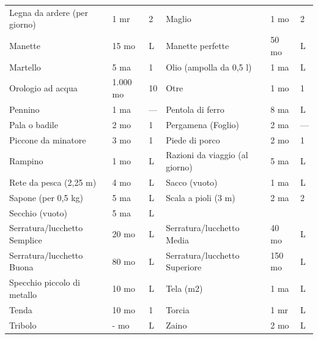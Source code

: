 \documentclass[a4paper,11pt,twoside,openany]{book}
\begin{document}
\begin{tabularx}{1\textwidth}{XllXll}
	Legna da ardere (per giorno)& 1 mr& 2   & Maglio& 1 mo& 2   \\
	Manette & 15 mo    & L   & Manette perfette    & 50 mo& L   \\
	Martello& 5 ma& 1   & Olio (ampolla da 0,5 l)& 1 ma& L   \\
	Orologio ad acqua   & 1.000 mo & 10  & Otre  & 1 mo& 1   \\
	Pennino & 1 ma& —   & Pentola di ferro    & 8 ma& L   \\
	Pala o badile & 2 mo& 1   & Pergamena (Foglio)  & 2 ma& —   \\
	Piccone da minatore & 3 mo& 1   & Piede di porco& 2 mo& 1   \\
	Rampino & 1 mo& L   & Razioni da viaggio (al giorno)    & 5 ma& L   \\
	Rete da pesca (2,25 m)& 4 mo& L   & Sacco (vuoto) & 1 ma& L   \\
	Sapone (per 0,5 kg) & 5 ma& L   & Scala a pioli (3 m) & 2 ma& 2   \\
	Secchio (vuoto)& 5 ma& L   & \\
	Serratura/lucchetto Semplice& 20 mo    & L   & Serratura/lucchetto Media & 40 mo& L   \\
	Serratura/lucchetto Buona & 80 mo    & L   & Serratura/lucchetto Superiore& 150 mo    & L   \\
	Specchio piccolo di metallo & 10 mo    & L   & Tela (m2)& 1 ma& L   \\
	Tenda & 10 mo    & 1   & Torcia& 1 mr& L   \\
	Tribolo & - mo& L   & Zaino & 2 mo& L   \\
\end{tabularx}
\bigskip
\end{document}

